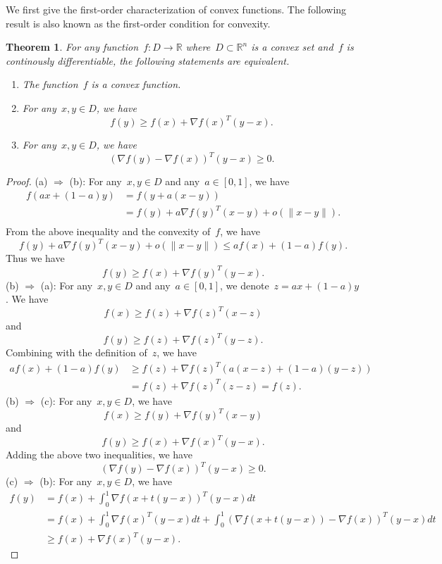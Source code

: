 \documentclass[12pt,a4paper,draft]{article}  %
\newtheorem{theorem}{Theorem}[section]
\theoremstyle{definition}
\numberwithin{equation}{section}
\newcommand{\RR}{\mathbb{R}}
\begin{document}
We first give the first-order characterization of convex functions. The following result is also known as the first-order condition for convexity.
\begin{theorem}
    For any function~$f: D \to \RR$ where~$D \subset \RR^n$ is a convex set and~$f$ is continously differentiable, the following statements are equivalent.
    \begin{enumerate}
        \item The function~$f$ is a convex function.
        \item For any~$x,y \in D$, we have
        $$ f(y) \geq f(x) + \nabla f(x)^T (y-x). $$
        \item For any~$x,y \in D$, we have
        $$ (\nabla f(y) - \nabla f(x))^T (y-x) \geq 0. $$
    \end{enumerate}
\end{theorem}
\begin{proof}
    (a) $\Rightarrow$ (b): For any~$x,y \in D$ and any~$a \in \left[ 0,1 \right]$, we have
    \begin{align*}
        f(ax+(1-a)y) & = f(y+a(x-y)) \\
        & = f(y)+a \nabla f(y)^T (x-y) + o(\|x-y\|). \\
    \end{align*}
    From the above inequality and the convexity of~$f$, we have
    \[
    f(y)+a \nabla f(y)^T (x-y) + o(\|x-y\|) \leq a f(x) + (1-a) f(y).
    \]
    Thus we have 
    \[ f(y) \geq f(x) + \nabla f(y)^T (y-x). \]
    (b) $\Rightarrow$ (a):  For any~$x,y \in D$ and any~$a \in \left[ 0,1 \right]$, we denote~$z=ax+(1-a)y$. 
    We have
    \[
    f(x) \geq f(z) + \nabla f(z)^T (x-z)
    \]
    and 
    \[
    f(y) \geq f(z) + \nabla f(z)^T (y-z).
    \]
    Combining with the definition of~$z$, we have
    \begin{align*}
        a f(x) +(1-a) f(y) & \geq f(z) + \nabla f(z)^T (a(x-z)+(1-a)(y-z)) \\
        & = f(z) + \nabla f(z)^T (z-z)= f(z).
    \end{align*}
    (b) $\Rightarrow$ (c): For any~$x,y \in D$, we have
    \[
    f(x) \geq f(y) + \nabla f(y)^T (x-y)
    \]
    and 
    \[
    f(y) \geq f(x) + \nabla f(x)^T (y-x).
    \]
    Adding the above two inequalities, we have
    \[
    (\nabla f(y) - \nabla f(x))^T (y-x) \geq 0.
    \]
    (c) $\Rightarrow$ (b): For any~$x,y \in D$, we have
    \begin{align*}
        f(y) & = f(x) + \int_{0}^{1} \nabla f(x+t(y-x))^T (y-x) dt \\
        & = f(x) + \int_{0}^{1} \nabla f(x)^T (y-x) dt + \int_{0}^{1} (\nabla f(x+t(y-x)) - \nabla f(x))^T (y-x) dt \\
        & \geq f(x) + \nabla f(x)^T (y-x).
    \end{align*}
\end{proof}
\end{document}

